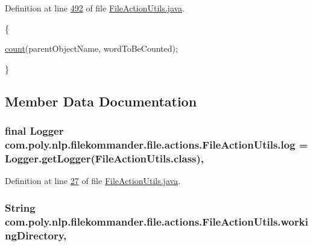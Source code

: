 Definition at line \hyperlink{L492}{492} of file \hyperlink{}{File\-Action\-Utils.\-java}.


\begin{DoxyCode}
                               \{

        \hyperlink{classcom_1_1poly_1_1nlp_1_1filekommander_1_1file_1_1actions_1_1_file_action_utils_a2df1aca8a703f77ff7ca700541d6fb6b}{count}(parentObjectName, wordToBeCounted);

    \}
\end{DoxyCode}


\subsection{Member Data Documentation}
\hypertarget{classcom_1_1poly_1_1nlp_1_1filekommander_1_1file_1_1actions_1_1_file_action_utils_a7af6d26171248a2e7253d9bce1b287cc}{
\subsubsection[{log}]{\setlength{\rightskip}{0pt plus 5cm}final Logger com.\-poly.\-nlp.\-filekommander.\-file.\-actions.\-File\-Action\-Utils.\-log = Logger.\-get\-Logger(File\-Action\-Utils.\-class)\hspace{0.3cm}{\ttfamily [static]}, {\ttfamily [private]}}}\label{classcom_1_1poly_1_1nlp_1_1filekommander_1_1file_1_1actions_1_1_file_action_utils_a7af6d26171248a2e7253d9bce1b287cc}


Definition at line \hyperlink{L27}{27} of file \hyperlink{}{File\-Action\-Utils.\-java}.

\hypertarget{classcom_1_1poly_1_1nlp_1_1filekommander_1_1file_1_1actions_1_1_file_action_utils_ad54a8fdc9145d2f423c54cb1597f874a}{
\subsubsection[{working\-Directory}]{\setlength{\rightskip}{0pt plus 5cm}String com.\-poly.\-nlp.\-filekommander.\-file.\-actions.\-File\-Action\-Utils.\-working\-Directory\hspace{0.3cm}{\ttfamily [static]}, {\ttfamily [private]}}}\label{classcom_1_1poly_1_1nlp_1_1filekommander_1_1file_1_1actions_1_1_file_action_utils_ad54a8fdc9145d2f423c54cb1597f874a}


